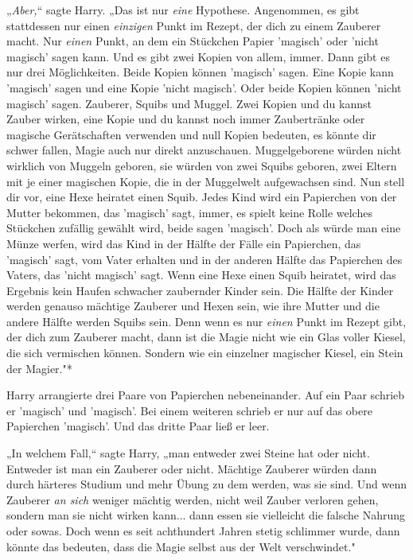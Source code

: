 {„\emph{Aber,}“ sagte Harry. „Das ist nur \emph{eine} Hypothese. Angenommen, es gibt stattdessen nur einen \emph{einzigen} Punkt im Rezept, der dich zu einem Zauberer macht. Nur \emph{einen} Punkt, an dem ein Stückchen Papier 'magisch' oder 'nicht magisch' sagen kann. Und es gibt zwei Kopien von allem, immer. Dann gibt es nur drei Möglichkeiten. Beide Kopien können 'magisch' sagen. Eine Kopie kann 'magisch' sagen und eine Kopie 'nicht magisch'. Oder beide Kopien können 'nicht magisch' sagen. Zauberer, Squibs und Muggel. Zwei Kopien und du kannst Zauber wirken, eine Kopie und du kannst noch immer Zaubertränke oder magische Gerätschaften verwenden und null Kopien bedeuten, es könnte dir schwer fallen, Magie auch nur direkt anzuschauen. Muggelgeborene würden nicht wirklich von Muggeln geboren, sie würden von zwei Squibs geboren, zwei Eltern mit je einer magischen Kopie, die in der Muggelwelt aufgewachsen sind. Nun stell dir vor, eine Hexe heiratet einen Squib. Jedes Kind wird ein Papierchen von der Mutter bekommen, das 'magisch' sagt, immer, es spielt keine Rolle welches Stückchen zufällig gewählt wird, beide sagen 'magisch'. Doch als würde man eine Münze werfen, wird das Kind in der Hälfte der Fälle ein Papierchen, das 'magisch' sagt, vom Vater erhalten und in der anderen Hälfte das Papierchen des Vaters, das 'nicht magisch' sagt. Wenn eine Hexe einen Squib heiratet, wird das Ergebnis kein Haufen schwacher zaubernder Kinder sein. Die Hälfte der Kinder werden genauso mächtige Zauberer und Hexen sein, wie ihre Mutter und die andere Hälfte werden Squibs sein. Denn wenn es nur \emph{einen} Punkt im Rezept gibt, der dich zum Zauberer macht, dann ist die Magie nicht wie ein Glas voller Kiesel, die sich vermischen können. Sondern wie ein einzelner magischer Kiesel, ein Stein der Magier."*

Harry arrangierte drei Paare von Papierchen nebeneinander. Auf ein Paar schrieb er 'magisch' und 'magisch'. Bei einem weiteren schrieb er nur auf das obere Papierchen 'magisch'. Und das dritte Paar ließ er leer.

„In welchem Fall,“ sagte Harry, „man entweder zwei Steine hat oder nicht. Entweder ist man ein Zauberer oder nicht. Mächtige Zauberer würden dann durch härteres Studium und mehr Übung zu dem werden, was sie sind. Und wenn Zauberer \emph{an sich} weniger mächtig werden, nicht weil Zauber verloren gehen, sondern man sie nicht wirken kann... dann essen sie vielleicht die falsche Nahrung oder sowas. Doch wenn es seit achthundert Jahren stetig schlimmer wurde, dann könnte das bedeuten, dass die Magie selbst aus der Welt verschwindet."

}
